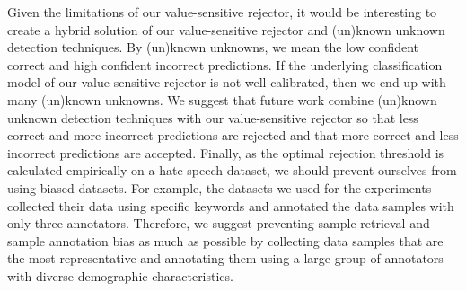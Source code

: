 %
Given the limitations of our value-sensitive rejector, it would be interesting to create a hybrid solution of our value-sensitive rejector and (un)known unknown detection techniques.
%
By (un)known unknowns, we mean the low confident correct and high confident incorrect predictions.
%
If the underlying classification model of our value-sensitive rejector is not well-calibrated, then we end up with many (un)known unknowns.
%
We suggest that future work combine (un)known unknown detection techniques with our value-sensitive rejector so that less correct and more incorrect predictions are rejected and that more correct and less incorrect predictions are accepted.
%
Finally, as the optimal rejection threshold is calculated empirically on a hate speech dataset, we should prevent ourselves from using biased datasets.
%
For example, the datasets we used for the experiments collected their data using specific keywords and annotated the data samples with only three annotators.
%
Therefore, we suggest preventing sample retrieval and sample annotation bias as much as possible by collecting data samples that are the most representative and annotating them using a large group of annotators with diverse demographic characteristics.
